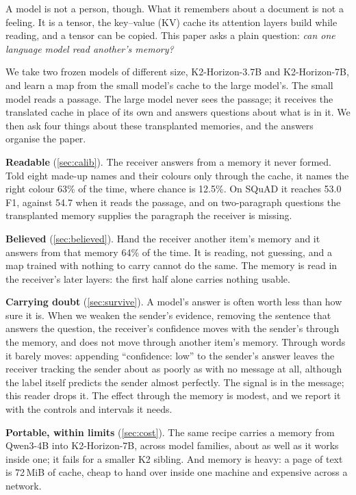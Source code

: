 \documentclass{article}
\begin{document}
A model is not a person, though. What it remembers about a document is not a feeling. It is a tensor, the key--value (KV) cache its attention layers build while reading, and a tensor can be copied. This paper asks a plain question: \emph{can one language model read another's memory?}

We take two frozen models of different size, K2-Horizon-3.7B and K2-Horizon-7B, and learn a map from the small model's cache to the large model's. The small model reads a passage. The large model never sees the passage; it receives the translated cache in place of its own and answers questions about what is in it. We then ask four things about these transplanted memories, and the answers organise the paper.

\textbf{Readable} (\cref{sec:calib}). The receiver answers from a memory it never formed. Told eight made-up names and their colours only through the cache, it names the right colour 63\% of the time, where chance is 12.5\%. On SQuAD it reaches 53.0 F1, against 54.7 when it reads the passage, and on two-paragraph questions the transplanted memory supplies the paragraph the receiver is missing.

\textbf{Believed} (\cref{sec:believed}). Hand the receiver another item's memory and it answers from that memory 64\% of the time. It is reading, not guessing, and a map trained with nothing to carry cannot do the same. The memory is read in the receiver's later layers: the first half alone carries nothing usable.

\textbf{Carrying doubt} (\cref{sec:survive}). A model's answer is often worth less than how sure it is. When we weaken the sender's evidence, removing the sentence that answers the question, the receiver's confidence moves with the sender's through the memory, and does not move through another item's memory. Through words it barely moves: appending ``confidence: low'' to the sender's answer leaves the receiver tracking the sender about as poorly as with no message at all, although the label itself predicts the sender almost perfectly. The signal is in the message; this reader drops it. The effect through the memory is modest, and we report it with the controls and intervals it needs.

\textbf{Portable, within limits} (\cref{sec:cost}). The same recipe carries a memory from Qwen3-4B into K2-Horizon-7B, across model families, about as well as it works inside one; it fails for a smaller K2 sibling. And memory is heavy: a page of text is 72\,MiB of cache, cheap to hand over inside one machine and expensive across a network.
\end{document}
